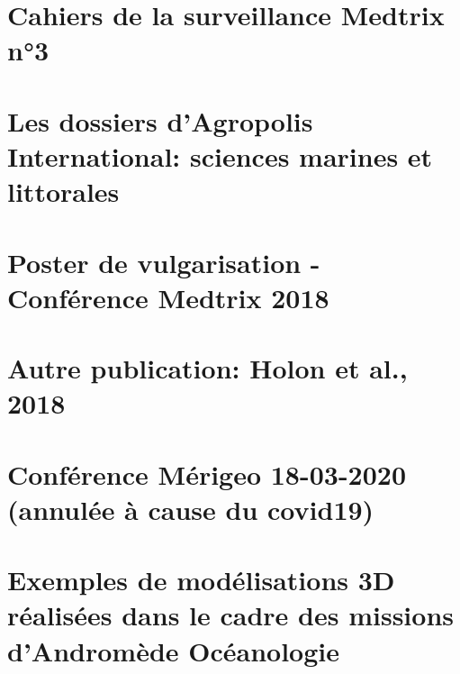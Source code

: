 \documentclass[11pt,a4paper]{book} %
\begin{document}
\begin{appendices}
	\noappendicestocpagenum
	\appendix
	
	\chapter{Cahiers de la surveillance Medtrix n°3} 
	\label{annexe-cahiers}
    
    
    \chapter[Les dossiers d'Agropolis International]{Les dossiers d'Agropolis International: sciences marines et littorales}
    \label{annexe-agropolis}
    
    
    \chapter{Poster de vulgarisation - Conférence Medtrix 2018} 
    \label{annexe-medtrix}
    
    
    \chapter{Autre publication: Holon et al., 2018} 
    \label{annexe-holon}
    
    
    \chapter{Conférence Mérigeo 18-03-2020 (annulée à cause du covid19)} 
    \label{annexe-merigeo}
    
    
    \chapter{Exemples de modélisations 3D réalisées dans le cadre des missions d'Andromède Océanologie} 
    \label{annexe-modelisations}
    
    

\end{appendices}
\end{document}
